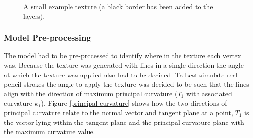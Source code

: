       \begin{figure}
        \centering

        \caption{A small example texture (a black border has been added to the layers).}
        \label{tex-example}
      \end{figure}

    \subsubsection{Model Pre-processing}

      The model had to be pre-processed to identify where in the texture each
      vertex was.  Because the texture was generated with lines in a single
      direction the angle at which the texture was applied also had to be
      decided.  To best simulate real pencil strokes the angle to apply the
      texture was decided to be such that the lines align with the direction of
      maximum principal curvature ($T_1$ with associated curvature $\kappa_1$).
      Figure \ref{principal-curvature} shows how the two directions of principal
      curvature relate to the normal vector and tangent plane at a point, $T_1$
      is the vector lying within the tangent plane and the principal curvature
      plane with the maximum curvature value.

